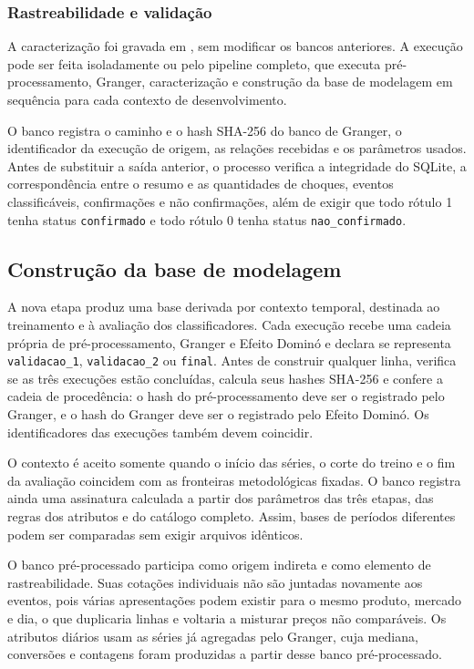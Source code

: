 \documentclass[12pt,a4paper]{article}
\begin{document}
\subsubsection{Rastreabilidade e validação}

A caracterização foi gravada em
, sem modificar os bancos
anteriores. A execução pode ser feita isoladamente ou pelo pipeline completo,
que executa pré-processamento, Granger, caracterização e construção da base de
modelagem em sequência para cada contexto de desenvolvimento.

O banco registra o caminho e o hash SHA-256 do banco de Granger, o identificador
da execução de origem, as relações recebidas e os parâmetros usados. Antes de
substituir a saída anterior, o processo verifica a integridade do SQLite, a
correspondência entre o resumo e as quantidades de choques, eventos
classificáveis, confirmações e não confirmações, além de exigir que todo rótulo
1 tenha status \texttt{confirmado} e todo rótulo 0 tenha status
\texttt{nao\_confirmado}.

\subsection{Construção da base de modelagem}

A nova etapa produz uma base derivada por contexto temporal, destinada ao
treinamento e à avaliação dos classificadores. Cada execução recebe uma cadeia
própria de pré-processamento, Granger e Efeito Dominó e declara se representa
\texttt{validacao\_1}, \texttt{validacao\_2} ou \texttt{final}. Antes de
construir qualquer linha, verifica se as três execuções estão concluídas,
calcula seus hashes SHA-256 e confere a cadeia de procedência: o hash do
pré-processamento deve ser o registrado pelo Granger, e o hash do Granger deve
ser o registrado pelo Efeito Dominó. Os identificadores das execuções também
devem coincidir.

O contexto é aceito somente quando o início das séries, o corte do treino e o
fim da avaliação coincidem com as fronteiras metodológicas fixadas. O banco
registra ainda uma assinatura calculada a partir dos parâmetros das três
etapas, das regras dos atributos e do catálogo completo. Assim, bases de
períodos diferentes podem ser comparadas sem exigir arquivos idênticos.

O banco pré-processado participa como origem indireta e como elemento de
rastreabilidade. Suas cotações individuais não são juntadas novamente aos
eventos, pois várias apresentações podem existir para o mesmo produto, mercado
e dia, o que duplicaria linhas e voltaria a misturar preços não comparáveis. Os
atributos diários usam as séries já agregadas pelo Granger, cuja mediana,
conversões e contagens foram produzidas a partir desse banco pré-processado.
\end{document}
